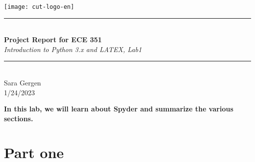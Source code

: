 \documentclass[12pt,a4paper]{article}
\newcommand{\HRule}{\rule{\linewidth}{0.5mm}}
\begin{document}
\begin{titlepage}
\begin{center}

\texttt{[image: cut-logo-en]}~\\[2cm]


\HRule \\[0.4cm]
{ \LARGE 
  \textbf{Project Report for ECE 351}\\[0.4cm]
  \emph{Introduction to Python 3.x and LATEX, Lab1}\\[0.4cm]
}
\HRule \\[1.5cm]



{ \large
  Sara Gergen \\[0.1cm]
  1/24/2023\\[0.1cm]
}

\vfill



 
\end{center}
\end{titlepage}


\newpage

{\LARGE{}}


\textbf{In this lab, we will learn about Spyder and summarize the various sections.}


\section{Part one}
\end{document}

